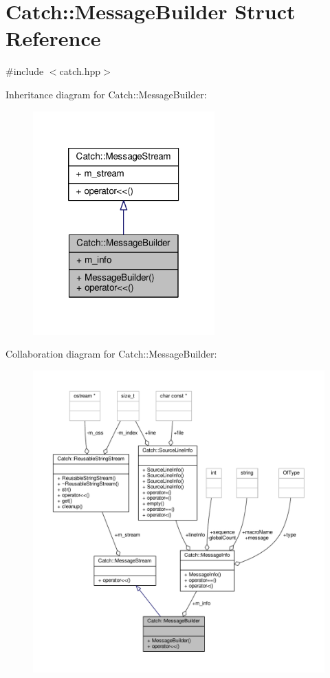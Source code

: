 \hypertarget{struct_catch_1_1_message_builder}{\section{Catch\-:\-:Message\-Builder Struct Reference}
\label{struct_catch_1_1_message_builder}
}


{\ttfamily \#include $<$catch.\-hpp$>$}



Inheritance diagram for Catch\-:\-:Message\-Builder\-:
\nopagebreak
\begin{figure}[H]
\begin{center}
\leavevmode
\includegraphics[width=198pt]{struct_catch_1_1_message_builder__inherit__graph}
\end{center}
\end{figure}


Collaboration diagram for Catch\-:\-:Message\-Builder\-:
\nopagebreak
\begin{figure}[H]
\begin{center}
\leavevmode
\includegraphics[width=350pt]{struct_catch_1_1_message_builder__coll__graph}
\end{center}
\end{figure}
